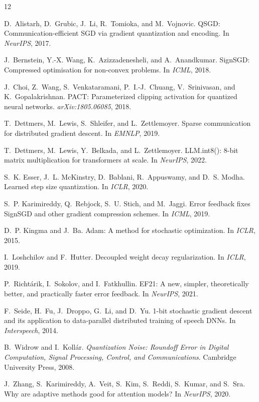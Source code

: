 \documentclass[10pt,twocolumn]{article}
\begin{document}

\begin{thebibliography}{12}

D.~Alistarh, D.~Grubic, J.~Li, R.~Tomioka, and M.~Vojnovic.
QSGD: Communication-efficient SGD via gradient quantization and encoding.
In \emph{NeurIPS}, 2017.

J.~Bernstein, Y.-X. Wang, K.~Azizzadenesheli, and A.~Anandkumar.
SignSGD: Compressed optimisation for non-convex problems.
In \emph{ICML}, 2018.

J.~Choi, Z.~Wang, S.~Venkataramani, P.~I.-J.~Chuang, V.~Srinivasan,
and K.~Gopalakrishnan.
PACT: Parameterized clipping activation for quantized neural networks.
\emph{arXiv:1805.06085}, 2018.

T.~Dettmers, M.~Lewis, S.~Shleifer, and L.~Zettlemoyer.
Sparse communication for distributed gradient descent.
In \emph{EMNLP}, 2019.

T.~Dettmers, M.~Lewis, Y.~Belkada, and L.~Zettlemoyer.
{LLM.int8()}: 8-bit matrix multiplication for transformers at scale.
In \emph{NeurIPS}, 2022.

S.~K. Esser, J.~L. McKinstry, D.~Bablani, R.~Appuswamy,
and D.~S. Modha.
Learned step size quantization.
In \emph{ICLR}, 2020.

S.~P. Karimireddy, Q.~Rebjock, S.~U. Stich, and M.~Jaggi.
Error feedback fixes SignSGD and other gradient compression schemes.
In \emph{ICML}, 2019.

D.~P. Kingma and J.~Ba.
Adam: A method for stochastic optimization.
In \emph{ICLR}, 2015.

I.~Loshchilov and F.~Hutter.
Decoupled weight decay regularization.
In \emph{ICLR}, 2019.

P.~Richt\'{a}rik, I.~Sokolov, and I.~Fatkhullin.
EF21: A new, simpler, theoretically better, and practically faster
error feedback.
In \emph{NeurIPS}, 2021.

F.~Seide, H.~Fu, J.~Droppo, G.~Li, and D.~Yu.
1-bit stochastic gradient descent and its application to
data-parallel distributed training of speech DNNs.
In \emph{Interspeech}, 2014.

B.~Widrow and I.~Koll\'{a}r.
\emph{Quantization Noise: Roundoff Error in Digital Computation,
Signal Processing, Control, and Communications}.
Cambridge University Press, 2008.

J.~Zhang, S.~Karimireddy, A.~Veit, S.~Kim, S.~Reddi, S.~Kumar,
and S.~Sra.
Why are adaptive methods good for attention models?
In \emph{NeurIPS}, 2020.

\end{thebibliography}
\end{document}
